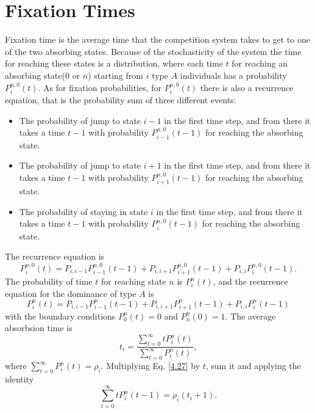 \section{Fixation Times}
Fixation time is the average time that the competition system takes to get to one of the two absorbing states\cite{Antal, Traulsen2009}. Because of the stochasticity of the system the time for reaching these states is a distribution, where each time $t$ for reaching an absorbing state($0$ or $n$) starting from $i$ type $A$ individuals has a probability $P_i ^{n,0} (t)$. As for fixation probabilities, for $P_i ^{n,0} (t)$ there is also a recurrence equation, that is the probability sum of three different events:
\begin{itemize}
\item The probability of jump to state $i-1$ in the first time step, and from there it takes a time $t-1$ with probability $P_{i-1}^{n,0}(t-1)$ for reaching the absorbing state.
\item The probability of jump to state $i+1$ in the first time step, and from there it takes a time $t-1$ with probability $P_{i+1}^{n,0}(t-1)$ for reaching the absorbing state.
\item The probability of staying in state $i$ in the first time step, and from there it takes a time $t-1$ with probability $P_{i}^{n,0}(t-1)$ for reaching the absorbing state.
\end{itemize}
 The recurrence equation is
 \begin{equation}
 P_i ^{n,0} (t)= P_{i,i-1}P_{i-1}^{n,0}(t-1)+P_{i,i+1}P_{i+1}^{n,0}(t-1)+P_{i,i}P_{i}^{n,0}(t-1).
 \end{equation}  
The probability of time $t$ for reaching state $n$ is $P_{i}^{n}(t)$, and the recurrence equation for the dominance of type $A$ is\cite{Antal}
 \begin{equation}\label{4.27}
 P_i ^{n} (t)= P_{i,i-1}P_{i-1}^{n}(t-1)+P_{i,i+1}P_{i+1}^{n}(t-1)+P_{i,i}P_{i}^{n}(t-1)
 \end{equation} 
 with the boundary conditions  $P_{0}^{n}(t)=0$ and $P_{n}^{n}(0)=1$. The average absorbsion time is
 \begin{equation}
 t_i = \frac{\sum\limits_{t=0}^{\infty}tP_{i}^{n}(t)}{\sum\limits_{t=0}^{\infty}P_{i}^{n}(t)},
 \end{equation}
 where $\sum\limits_{t=0}^{\infty}P_{i}^{n}(t)=\rho_i $.
 Multiplying Eq. \eqref{4.27} by $t$,  sum it and applying the  identity
 \begin{equation}
 \sum\limits_{t=0}^{\infty}tP_{i}^{n}(t-1)=\rho_{i}(t_i + 1).
 \end{equation}
